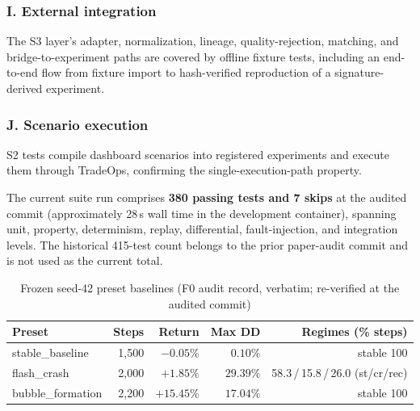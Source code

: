 \documentclass[conference]{IEEEtran}
\begin{document}
\subsubsection*{I. External integration} The S3 layer's adapter,
normalization, lineage, quality-rejection, matching, and
bridge-to-experiment paths are covered by offline fixture tests,
including an end-to-end flow from fixture import to hash-verified
reproduction of a signature-derived experiment.

\subsubsection*{J. Scenario execution} S2 tests compile dashboard
scenarios into registered experiments and execute them through
TradeOps, confirming the single-execution-path property.

The current suite run comprises \textbf{380 passing tests and 7
skips} at the audited commit (approximately 28\,s wall time in the
development container), spanning unit, property, determinism, replay,
differential, fault-injection, and integration levels. The historical
415-test count belongs to the prior paper-audit commit and is not used
as the current total.

\begin{table}[t]
\caption{Frozen seed-42 preset baselines (F0 audit record, verbatim;
re-verified at the audited commit)}
\label{tab:presets}
\centering
\scriptsize
\setlength{\tabcolsep}{3.5pt}
\begin{tabular}{lrrrr}
\toprule
\textbf{Preset} & \textbf{Steps} & \textbf{Return} &
\textbf{Max DD} & \textbf{Regimes (\% steps)} \\
\midrule
stable\_baseline & 1{,}500 & $-0.05\%$ & $0.10\%$ & stable 100 \\
flash\_crash & 2{,}000 & $+1.85\%$ & $29.39\%$ &
58.3\,/\,15.8\,/\,26.0 (st/cr/rec) \\
bubble\_formation & 2{,}200 & $+15.45\%$ & $17.04\%$ & stable 100 \\
\bottomrule
\end{tabular}
\end{table}
\end{document}
